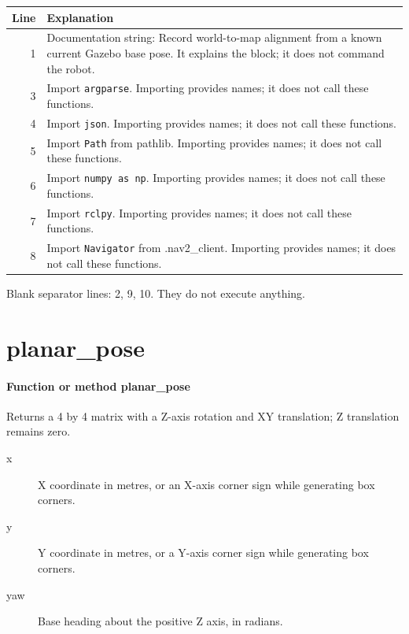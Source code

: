 \documentclass[11pt,a4paper]{book}
\begin{document}
\begin{longtable}{r p{}}

\textbf{Line} & \textbf{Explanation} \\ \hline \endhead

1 & Documentation string: Record world-to-map alignment from a known current Gazebo base pose. It explains the block; it does not command the robot. \\

3 & Import \texttt{argparse}. Importing provides names; it does not call these functions. \\

4 & Import \texttt{json}. Importing provides names; it does not call these functions. \\

5 & Import \texttt{Path} from pathlib. Importing provides names; it does not call these functions. \\

6 & Import \texttt{numpy as np}. Importing provides names; it does not call these functions. \\

7 & Import \texttt{rclpy}. Importing provides names; it does not call these functions. \\

8 & Import \texttt{Navigator} from .nav2\_client. Importing provides names; it does not call these functions. \\

\end{longtable}

Blank separator lines: 2, 9, 10. They do not execute anything.

\section{planar\_pose}

\paragraph{Function or method planar\_pose}
Returns a 4 by 4 matrix with a Z-axis rotation and XY translation; Z translation remains zero.

\begin{description}
\item[x] X coordinate in metres, or an X-axis corner sign while generating box corners.
\item[y] Y coordinate in metres, or a Y-axis corner sign while generating box corners.
\item[yaw] Base heading about the positive Z axis, in radians.
\end{description}
\end{document}
